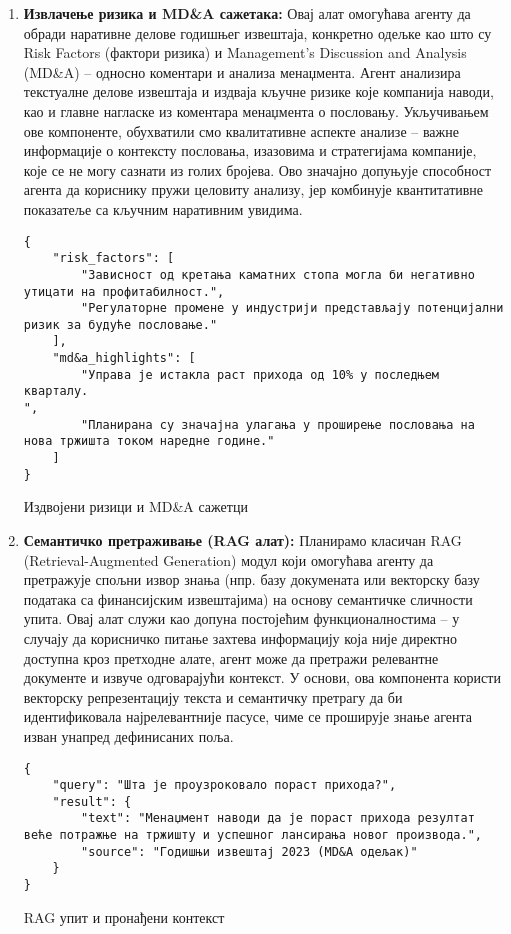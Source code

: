 \begin{enumerate}
    \item \textbf{Извлачење ризика и MD\&A сажетака:} Овај алат омогућава агенту да обради наративне делове годишњег извештаја, конкретно одељке као што су Risk Factors (фактори ризика) и Management's Discussion and Analysis (MD\&A) -- односно коментари и анализа менаџмента. Агент анализира текстуалне делове извештаја и издваја кључне ризике које компанија наводи, као и главне нагласке из коментара менаџмента о пословању. Укључивањем ове компоненте, обухватили смо квалитативне аспекте анализе -- важне информације о контексту пословања, изазовима и стратегијама компаније, које се не могу сазнати из голих бројева. Ово значајно допуњује способност агента да кориснику пружи целовиту анализу, јер комбинује квантитативне показатеље са кључним наративним увидима.

    \begin{listing}[!ht]
    \begin{verbatim}
{
    "risk_factors": [
        "Зависност од кретања каматних стопа могла би негативно утицати на профитабилност.",
        "Регулаторне промене у индустрији представљају потенцијални ризик за будуће пословање."
    ],
    "md&a_highlights": [
        "Управа је истакла раст прихода од 10% у последњем кварталу.
",
        "Планирана су значајна улагања у проширење пословања на нова тржишта током наредне године."
    ]
}
    \end{verbatim}
    \caption{Издвојени ризици и MD\&A сажетци}\label{lst:risks_mda_json}
    \end{listing}

    \item \textbf{Семантичко претраживање (RAG алат):} Планирамо класичан RAG (Retrieval-Augmented Generation) модул који омогућава агенту да претражује спољни извор знања (нпр. базу докумената или векторску базу података са финансијским извештајима) на основу семантичке сличности упита. Овај алат служи као допуна постојећим функционалностима -- у случају да корисничко питање захтева информацију која није директно доступна кроз претходне алате, агент може да претражи релевантне документе и извуче одговарајући контекст. У основи, ова компонента користи векторску репрезентацију текста и семантичку претрагу да би идентификовала најрелевантније пасусе, чиме се проширује знање агента изван унапред дефинисаних поља.

    \begin{listing}[!ht]
    \begin{verbatim}
{
    "query": "Шта је проузроковало пораст прихода?",
    "result": {
        "text": "Менаџмент наводи да је пораст прихода резултат веће потражње на тржишту и успешног лансирања новог производа.",
        "source": "Годишњи извештај 2023 (MD&A одељак)"
    }
}
    \end{verbatim}
    \caption{RAG упит и пронађени контекст}\label{lst:rag_json}
    \end{listing}
\end{enumerate}

